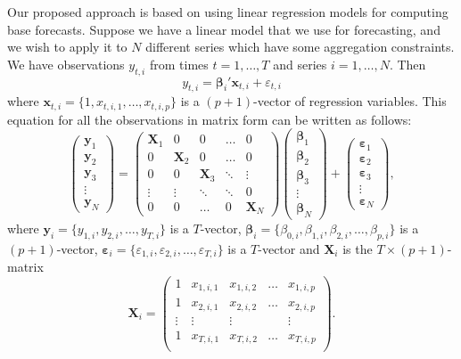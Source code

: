 \documentclass[11pt,a4paper,]{article}
\begin{document}
Our proposed approach is based on using linear regression models for
computing base forecasts. Suppose we have a linear model that we use for
forecasting, and we wish to apply it to \(N\) different series which
have some aggregation constraints. We have observations \(y_{t,i}\) from
times \(t=1,\dots,T\) and series \(i=1,\dots,N\). Then
\begin{equation}\label{eq:basicequation}
y_{t,i} = \bm{\beta}_{i}' \bm{x}_{t,i} + \varepsilon_{t,i}
\end{equation} where \(\bm{x}_{t,i}=\{1, x_{t,i,1},\dots,x_{t,i,p}\}\)
is a \((p+1)\)-vector of regression variables. This equation for all the
observations in matrix form can be written as follows:
\begin{equation}\label{eq:linearmodel}
\begin{pmatrix}
\bm{y}_1\\
\bm{y}_2\\
\bm{y}_3 \\
\vdots\\
\bm{y}_N
\end{pmatrix}=
\begin{pmatrix}
\bm{X}_1 & 0        & 0       & \dots  & 0\\
0        & \bm{X}_2 & 0        & \dots  & 0\\
0        & 0        & \bm{X}_3 & \ddots & \vdots \\
\vdots   & \vdots   & \ddots   & \ddots & 0\\
0        & 0    & \dots    & 0      & \bm{X}_N
\end{pmatrix}
\begin{pmatrix}
\bm{\beta}_1\\
\bm{\beta}_2\\
\bm{\beta}_3\\
\vdots\\
\bm{\beta}_N
\end{pmatrix}+
\begin{pmatrix}
\bm{\varepsilon}_1\\
\bm{\varepsilon}_2\\
\bm{\varepsilon}_3\\
\vdots \\
\bm{\varepsilon}_N
\end{pmatrix},
\end{equation} where \(\bm{y}_i = \{y_{1,i}, y_{2,i}, \dots, y_{T,i}\}\)
is a \(T\)-vector,
\({\bm{\beta}}_i = \{\beta_{0,i}, \beta_{1,i}, \beta_{2,i}, \dots, \beta_{p,i}\}\)
is a \((p+1)\)-vector,
\({\bm{\varepsilon}}_i = \{\varepsilon_{1,i}, \varepsilon_{2,i}, \dots, \varepsilon_{T,i}\}\)
is a \(T\)-vector and \(\bm{X}_i\) is the \(T\times (p+1)\)-matrix
\begin{equation}\label{eq:Xmatrixdefinition}
\bm{X}_i = \begin{pmatrix}
1 & x_{1,i,1} & x_{1,i,2} & \dots & x_{1,i,p}\\
1 & x_{2,i,1} & x_{2,i,2} & \dots & x_{2,i,p}\\
\vdots & \vdots & \vdots & & \vdots \\
1 & x_{T,i,1} & x_{T,i,2} & \dots & x_{T,i,p}\\
\end{pmatrix}.
\end{equation}
\end{document}
